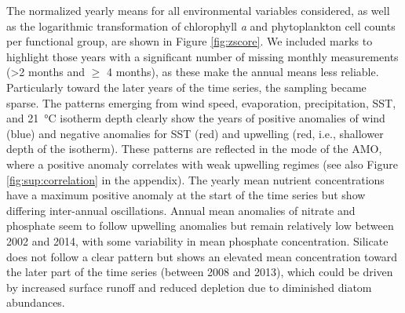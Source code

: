 \documentclass[draft]{agujournal2019}
\begin{document}
The normalized yearly means for all environmental variables considered, as well as the logarithmic transformation of chlorophyll \textit{a} and phytoplankton cell counts per functional group, are shown in Figure \ref{fig:zscore}. We included marks to highlight those years with a significant number of missing monthly measurements (\textgreater 2 months and $\geq$ 4 months), as these make the annual means less reliable. Particularly toward the later years of the time series, the sampling became sparse. The patterns emerging from wind speed, evaporation, precipitation, SST, and \qty{21}{\celsius} isotherm depth clearly show the years of positive anomalies of wind (blue) and negative anomalies for SST (red) and upwelling (red, i.e., shallower depth of the isotherm). These patterns are reflected in the mode of the AMO, where a positive anomaly correlates with weak upwelling regimes (see also Figure \ref{fig:sup:correlation} in the appendix). The yearly mean nutrient concentrations have a maximum positive anomaly at the start of the time series but show differing inter-annual oscillations. Annual mean anomalies of nitrate and phosphate seem to follow upwelling anomalies but remain relatively low between 2002 and 2014, with some variability in mean phosphate concentration. Silicate does not follow a clear pattern but shows an elevated mean concentration toward the later part of the time series (between 2008 and 2013), which could be driven by increased surface runoff \cite{lorenzoni_characterization_2015} and reduced depletion due to diminished diatom abundances.
\end{document}
